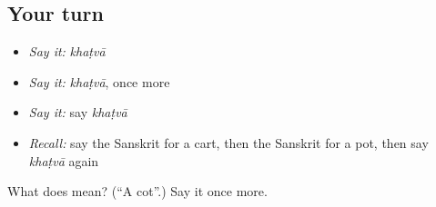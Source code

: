 \subsection*{Your turn}
\begin{itemize}
\raggedright
  \item \emph{Say it:} \emph{khaṭvā}
  \item \emph{Say it:} \emph{khaṭvā}, once more
  \item \emph{Say it:} say \emph{khaṭvā}
  \item \emph{Recall:} say the Sanskrit for a cart, then the Sanskrit for a pot, then say \emph{khaṭvā} again
\end{itemize}

\begin{tcolorbox}[breakable,colback=teal!4,colframe=teal!35!black,title={Before you move on}]
What does  mean? (\textquotedblleft{}A cot\textquotedblright{}.) Say it once more.
\end{tcolorbox}
